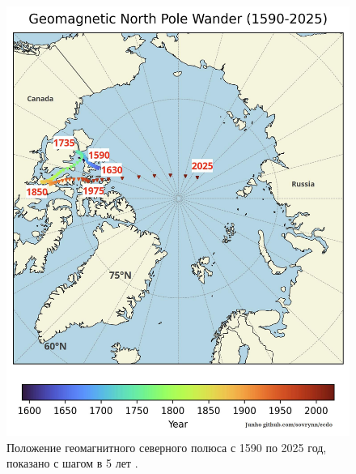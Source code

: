 \documentclass[10pt,twocolumn,letterpaper]{article}
\begin{document}
\begin{figure}[t]
\begin{center}
   \includegraphics[width=1\linewidth]{npw.jpg}
\end{center}
   \caption{Положение геомагнитного северного полюса с 1590 по 2025 год, показано с шагом в 5 лет \cite{142}.}
\label{fig:13}
\label{fig:onecol}
\end{figure}
\end{document}
